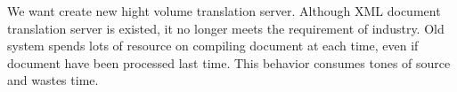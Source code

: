 We want create new hight volume translation server. Although XML document translation server is existed, it no longer meets the requirement of industry. Old system spends lots of resource on compiling document at each time, even if document have been processed last time. This behavior consumes tones of source and wastes time.